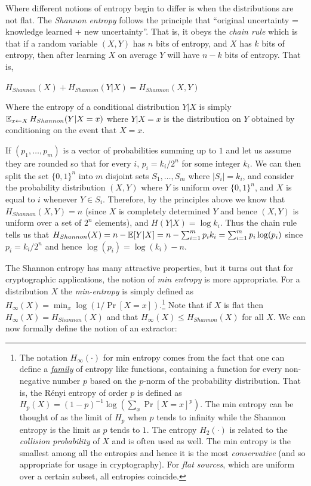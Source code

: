 Where different notions of entropy begin to differ is when the
distributions are not flat. The \emph{Shannon entropy} follows the
principle that ``original uncertainty = knowledge learned + new
uncertainty''. That is, it obeys the \emph{chain rule} which is that if
a random variable \((X,Y)\) has \(n\) bits of entropy, and \(X\) has
\(k\) bits of entropy, then after learning \(X\) on average \(Y\) will
have \(n-k\) bits of entropy. That is,

\(H_{Shannon}(X)+H_{Shannon}(Y|X) = H_{Shannon}(X,Y)\)

Where the entropy of a conditional distribution \(Y|X\) is simply
\(\operatorname*{\mathbb E}_{x\leftarrow X} H_{Shannon}(Y|X=x)\) where \(Y|X=x\) is the
distribution on \(Y\) obtained by conditioning on the event that
\(X=x\).

If \((p_1,\ldots,p_m)\) is a vector of probabilities summing up to \(1\)
and let us assume they are rounded so that for every \(i\),
\(p_i = k_i/2^n\) for some integer \(k_i\). We can then split the set
\(\{0,1\}^n\) into \(m\) disjoint sets \(S_1,\ldots,S_m\) where
\(|S_i|=k_i\), and consider the probability distribution \((X,Y)\) where
\(Y\) is uniform over \(\{0,1\}^n\), and \(X\) is equal to \(i\)
whenever \(Y\in S_i\). Therefore, by the principles above we know that
\(H_{Shannon}(X,Y)=n\) (since \(X\) is completely determined \(Y\) and
hence \((X,Y)\) is uniform over a set of \(2^n\) elements), and
\(H(Y|X)=\log k_i\). Thus the chain rule tells us that
\(H_{Shannon}(X) = n - \operatorname*{\mathbb E}[Y|X] = n - \sum_{i=1}^m p_i k_i = \sum_{i=1}^m p_i \log(p_i)\)
since \(p_i = k_i/2^n\) and hence \(\log(p_i)=\log(k_i)-n\).

The Shannon entropy has many attractive properties, but it turns out
that for cryptographic applications, the notion of \emph{min entropy} is
more appropriate. For a distribution \(X\) the \emph{min-entropy} is
simply defined as \(H_{\infty}(X)= \min_x \log(1/\Pr[X=x])\).\footnote{The
  notation \(H_{\infty}(\cdot)\) for min entropy comes from the fact
  that one can define a \href{https://goo.gl/HvVgu1}{\emph{family}} of
  entropy like functions, containing a function for every non-negative
  number \(p\) based on the \(p\)-norm of the probability distribution.
  That is, the Rényi entropy of order \(p\) is defined as
  \(H_p(X)=(1-p)^{-1}\log(\sum_x \Pr[X=x]^p)\). The min entropy can be
  thought of as the limit of \(H_p\) when \(p\) tends to infinity while
  the Shannon entropy is the limit as \(p\) tends to \(1\). The entropy
  \(H_2(\cdot)\) is related to the \emph{collision probability} of \(X\)
  and is often used as well. The min entropy is the smallest among all
  the entropies and hence it is the most \emph{conservative} (and so
  appropriate for usage in cryptography). For \emph{flat sources}, which
  are uniform over a certain subset, all entropies coincide.} Note that
if \(X\) is flat then \(H_{\infty}(X)=H_{Shannon}(X)\) and that
\(H_{\infty}(X) \leq H_{Shannon}(X)\) for all \(X\). We can now formally
define the notion of an extractor:

